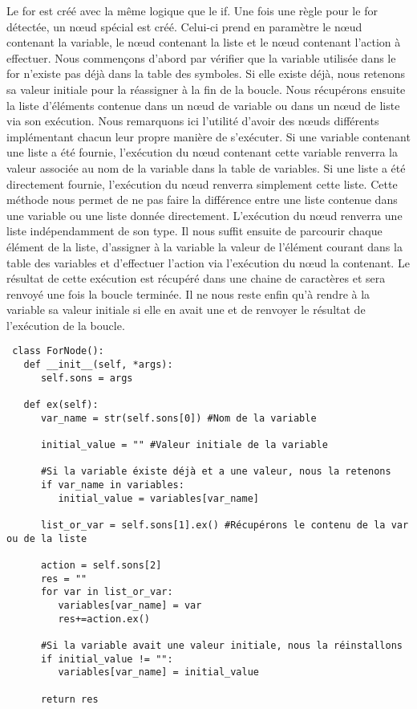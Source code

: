 \documentclass[a4paper,10pt]{article}
\begin{document}
Le \textrm{for} est créé avec la même logique que le \textrm{if}. Une fois une règle pour le \textrm{for} détectée, un nœud spécial est créé. Celui-ci prend en paramètre le nœud contenant
la variable, le nœud contenant la liste et le nœud contenant l'action à effectuer. Nous commençons d'abord par vérifier que la variable utilisée dans le for n'existe pas déjà dans la 
table des symboles. Si elle existe déjà, nous retenons sa valeur initiale pour la réassigner à la fin de la boucle. Nous récupérons ensuite la liste d'éléments contenue dans un nœud de variable
ou dans un nœud de liste via son exécution. Nous remarquons ici l'utilité d'avoir des nœuds différents implémentant chacun leur propre manière de s'exécuter. Si une variable contenant
une liste a été fournie, l'exécution du nœud contenant cette variable renverra la valeur associée au nom de la variable dans la table de variables. Si une liste a été directement fournie,
l'exécution du nœud renverra simplement cette liste. Cette méthode nous permet de ne pas faire la différence entre une liste contenue dans une variable ou une liste donnée directement. L'exécution
du nœud renverra une liste indépendamment de son type. Il nous suffit ensuite de parcourir chaque élément de la liste, d'assigner à la variable la valeur de l'élément courant dans la table
des variables et d'effectuer l'action via l'exécution du nœud la contenant. Le résultat de cette exécution est récupéré dans une chaine de caractères et sera renvoyé une fois la boucle 
terminée. Il ne nous reste enfin qu'à rendre à la variable sa valeur initiale si elle en avait une et de renvoyer le résultat de l'exécution de la boucle.
\begin{verbatim}
 class ForNode():
   def __init__(self, *args):
      self.sons = args
         
   def ex(self):
      var_name = str(self.sons[0]) #Nom de la variable

      initial_value = "" #Valeur initiale de la variable

      #Si la variable éxiste déjà et a une valeur, nous la retenons
      if var_name in variables:
         initial_value = variables[var_name]

      list_or_var = self.sons[1].ex() #Récupérons le contenu de la var ou de la liste
      
      action = self.sons[2]
      res = ""
      for var in list_or_var:
         variables[var_name] = var
         res+=action.ex()

      #Si la variable avait une valeur initiale, nous la réinstallons
      if initial_value != "":
         variables[var_name] = initial_value

      return res
\end{verbatim}
\end{document}
